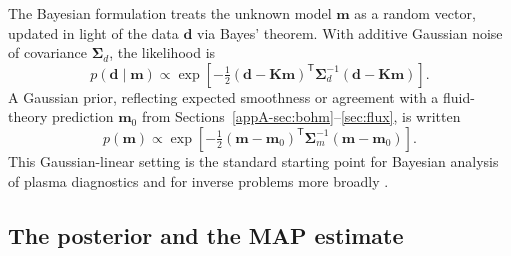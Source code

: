 The Bayesian formulation treats the unknown model $\mathbf{m}$ as a random vector, updated in light of the data $\mathbf{d}$ via Bayes' theorem. With additive Gaussian noise of covariance $\boldsymbol{\Sigma}_{d}$, the likelihood is
\begin{equation}
p(\mathbf{d}\mid\mathbf{m}) \propto \exp\!\left[-\tfrac{1}{2}(\mathbf{d}-\mathbf{K}\mathbf{m})^{\mathsf{T}}\boldsymbol{\Sigma}_{d}^{-1}(\mathbf{d}-\mathbf{K}\mathbf{m})\right].
\label{appA-eq:likelihood}
\end{equation}
A Gaussian prior, reflecting expected smoothness or agreement with a fluid-theory prediction $\mathbf{m}_{0}$ from Sections~\ref{appA-sec:bohm}--\ref{sec:flux}, is written
\begin{equation}
p(\mathbf{m}) \propto \exp\!\left[-\tfrac{1}{2}(\mathbf{m}-\mathbf{m}_{0})^{\mathsf{T}}\boldsymbol{\Sigma}_{m}^{-1}(\mathbf{m}-\mathbf{m}_{0})\right].
\label{eq:prior}
\end{equation}
This Gaussian-linear setting is the standard starting point for Bayesian analysis of plasma diagnostics \cite{ref0683,ref0684,ref0685} and for inverse problems more broadly \cite{ref0687}.

\subsection{The posterior and the MAP estimate}

